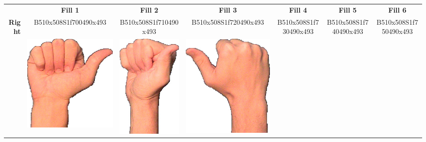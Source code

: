 \documentclass{article}
\begin{document}
\begin{center}
\begin{tabular}{r*{6}{c}}
&\textbf{Fill 1}&\textbf{Fill 2}&\textbf{Fill 3}&\textbf{Fill 4}&\textbf{Fill 5}&\textbf{Fill 6}\\
\multirow{2}{*}{\textbf{Right}}&
B510x508S1f700490x493&
B510x508S1f710490x493&
B510x508S1f720490x493&
B510x508S1f730490x493&
B510x508S1f740490x493&
B510x508S1f750490x493\\
&
\includegraphics[scale=0.1]{images/10-03-1.jpg}&
\includegraphics[scale=0.1]{images/10-03-2.jpg}&
\includegraphics[scale=0.1]{images/10-03-3.jpg}&

\end{tabular}
\end{center}
\end{document}
